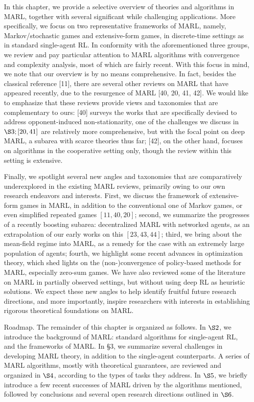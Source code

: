 \documentclass[10pt]{article}
\begin{document}
In this chapter, we provide a selective overview of theories and algorithms in MARL, together with several significant while challenging applications. More specifically, we focus on two representative frameworks of MARL, namely, Markov/stochastic games and extensive-form games, in discrete-time settings as in standard single-agent RL. In conformity with the aforementioned three groups, we review and pay particular attention to MARL algorithms with convergence and complexity analysis, most of which are fairly recent. With this focus in mind, we note that our overview is by no means comprehensive. In fact, besides the classical reference [11], there are several other reviews on MARL that have appeared recently, due to the resurgence of MARL [40, 20, 41, 42]. We would like to emphasize that these reviews provide views and taxonomies that are complementary to ours: [40] surveys the works that are specifically devised to address opponent-induced non-stationarity, one of the challenges we discuss in $\S 3 ;[20,41]$ are relatively more comprehensive, but with the focal point on deep MARL, a subarea with scarce theories thus far; [42], on the other hand, focuses on algorithms in the cooperative setting only, though the review within this setting is extensive.

Finally, we spotlight several new angles and taxonomies that are comparatively underexplored in the existing MARL reviews, primarily owing to our own research endeavors and interests. First, we discuss the framework of extensive-form games in MARL, in addition to the conventional one of Markov games, or even simplified repeated games $[11,40,20]$; second, we summarize the progresses of a recently boosting subarea: decentralized MARL with networked agents, as an extrapolation of our early works on this $[23,43,44]$; third, we bring about the mean-field regime into MARL, as a remedy for the case with an extremely large population of agents; fourth, we highlight some recent advances in optimization theory, which shed lights on the (non-)convergence of policy-based methods for MARL, especially zero-sum games. We have also reviewed some of the literature on MARL in partially observed settings, but without using deep RL as heuristic solutions. We expect these new angles to help identify fruitful future research directions, and more importantly, inspire researchers with interests in establishing rigorous theoretical foundations on MARL.

Roadmap. The remainder of this chapter is organized as follows. In $\S 2$, we introduce the background of MARL: standard algorithms for single-agent RL, and the frameworks of MARL. In §3, we summarize several challenges in developing MARL theory, in addition to the single-agent counterparts. A series of MARL algorithms, mostly with theoretical guarantees, are reviewed and organized in $\S 4$, according to the types of tasks they address. In $\S 5$, we briefly introduce a few recent successes of MARL driven by the algorithms mentioned, followed by conclusions and several open research directions outlined in $\S 6$.
\end{document}
